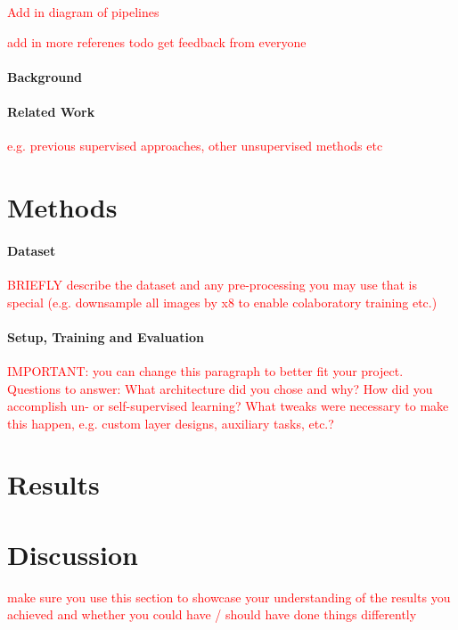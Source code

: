 \documentclass[twocolumn]{article}
\newcommand{\todo}[1]{\textcolor{red}{#1}}
\begin{document}
  \todo{Add in diagram of pipelines}

  \todo{add in more referenes}
  \todo{todo get feedback from everyone}

  \paragraph{Background}
  \paragraph{Related Work} \todo{e.g. previous supervised approaches, other unsupervised methods etc}

  \section{Methods}
  \paragraph{Dataset} \todo{BRIEFLY describe the dataset and any pre-processing you may use that is special (e.g. downsample all images by x8 to enable colaboratory training etc.)}

  \paragraph{Setup, Training and Evaluation} \todo{IMPORTANT: you can change this paragraph to better fit your project. Questions to answer: What architecture did you chose and why? How did you accomplish un- or self-supervised learning? What tweaks were necessary to make this happen, e.g. custom layer designs, auxiliary tasks, etc.?}



  \section{Results}


  \section{Discussion} \todo{make sure you use this section to showcase your understanding of the results you achieved and whether you could have / should have done things differently }
\end{document}
